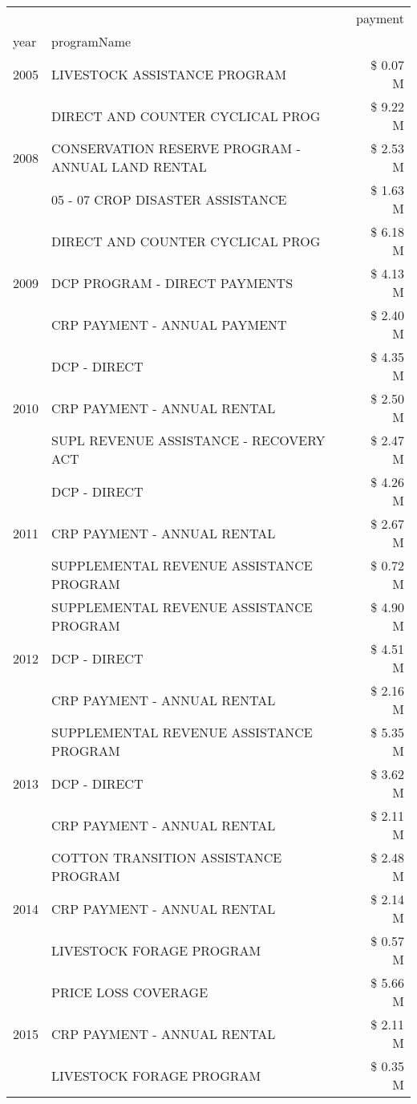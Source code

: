 \begin{tabular}{llr}
\toprule
 &  & payment \\
year & programName &  \\
\midrule
2005 & LIVESTOCK ASSISTANCE PROGRAM & \$ 0.07 M \\
\cline{1-3}
\multirow[t]{3}{*}{2008} & DIRECT AND COUNTER CYCLICAL PROG & \$ 9.22 M \\
 & CONSERVATION RESERVE PROGRAM - ANNUAL LAND RENTAL & \$ 2.53 M \\
 & 05 - 07 CROP DISASTER ASSISTANCE & \$ 1.63 M \\
\cline{1-3}
\multirow[t]{3}{*}{2009} & DIRECT AND COUNTER CYCLICAL PROG & \$ 6.18 M \\
 & DCP PROGRAM - DIRECT PAYMENTS & \$ 4.13 M \\
 & CRP PAYMENT - ANNUAL PAYMENT & \$ 2.40 M \\
\cline{1-3}
\multirow[t]{3}{*}{2010} & DCP - DIRECT & \$ 4.35 M \\
 & CRP PAYMENT - ANNUAL RENTAL & \$ 2.50 M \\
 & SUPL REVENUE ASSISTANCE - RECOVERY ACT & \$ 2.47 M \\
\cline{1-3}
\multirow[t]{3}{*}{2011} & DCP - DIRECT & \$ 4.26 M \\
 & CRP PAYMENT - ANNUAL RENTAL & \$ 2.67 M \\
 & SUPPLEMENTAL REVENUE ASSISTANCE PROGRAM & \$ 0.72 M \\
\cline{1-3}
\multirow[t]{3}{*}{2012} & SUPPLEMENTAL REVENUE ASSISTANCE PROGRAM & \$ 4.90 M \\
 & DCP - DIRECT & \$ 4.51 M \\
 & CRP PAYMENT - ANNUAL RENTAL & \$ 2.16 M \\
\cline{1-3}
\multirow[t]{3}{*}{2013} & SUPPLEMENTAL REVENUE ASSISTANCE PROGRAM & \$ 5.35 M \\
 & DCP - DIRECT & \$ 3.62 M \\
 & CRP PAYMENT - ANNUAL RENTAL & \$ 2.11 M \\
\cline{1-3}
\multirow[t]{3}{*}{2014} & COTTON TRANSITION ASSISTANCE PROGRAM & \$ 2.48 M \\
 & CRP PAYMENT - ANNUAL RENTAL & \$ 2.14 M \\
 & LIVESTOCK FORAGE PROGRAM & \$ 0.57 M \\
\cline{1-3}
\multirow[t]{3}{*}{2015} & PRICE LOSS COVERAGE & \$ 5.66 M \\
 & CRP PAYMENT - ANNUAL RENTAL & \$ 2.11 M \\
 & LIVESTOCK FORAGE PROGRAM & \$ 0.35 M \\

\end{tabular}
